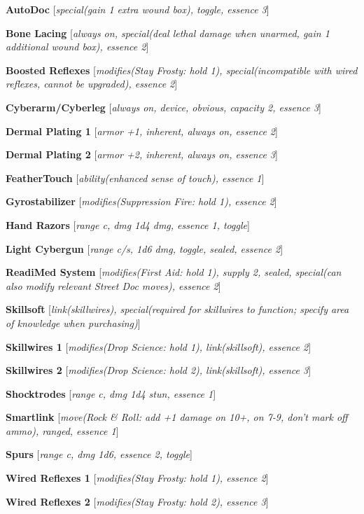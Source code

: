 \documentclass[oneside,10pt]{article}
\begin{document}
\begin{multicols}{2}
  \textbf{AutoDoc} [\textit{special(gain 1 extra wound box), toggle,
    essence 3}]

  \textbf{Bone Lacing} [\textit{always on, special(deal lethal damage
    when unarmed, gain 1 additional wound box), essence 2}]

  \textbf{Boosted Reflexes} [\textit{modifies(Stay Frosty: hold 1),
    special(incompatible with wired reflexes, cannot be upgraded),
    essence 2}]

  \textbf{Cyberarm/Cyberleg} [\textit{always on, device, obvious,
    capacity 2, essence 3}]

  \textbf{Dermal Plating 1} [\textit{armor +1, inherent, always on,
    essence 2}]

  \textbf{Dermal Plating 2} [\textit{armor +2, inherent, always on,
    essence 3}]

  \textbf{FeatherTouch} [\textit{ability(enhanced sense of touch),
    essence 1}]

  \textbf{Gyrostabilizer} [\textit{modifies(Suppression Fire: hold 1),
    essence 2}]

  \textbf{Hand Razors} [\textit{range c, dmg 1d4 dmg, essence 1,
    toggle}]

  \textbf{Light Cybergun} [\textit{range c/s, 1d6 dmg, toggle, sealed,
    essence 2}]

  \textbf{ReadiMed System} [\textit{modifies(First Aid: hold 1),
    supply 2, sealed, special(can also modify relevant Street Doc
    moves), essence 2}]

  \textbf{Skillsoft} [\textit{link(skillwires), special(required for
    skillwires to function; specify area of knowledge when
    purchasing)}]

  \textbf{Skillwires 1} [\textit{modifies(Drop Science: hold 1),
    link(skillsoft), essence 2}]

  \textbf{Skillwires 2} [\textit{modifies(Drop Science: hold 2),
    link(skillsoft), essence 3}]

  \textbf{Shocktrodes} [\textit{range c, dmg 1d4 stun, essence 1}]

  \textbf{Smartlink} [\textit{move(Rock \& Roll: add +1 damage on 10+,
    on 7-9, don’t mark off ammo), ranged, essence 1}]

  \textbf{Spurs} [\textit{range c, dmg 1d6, essence 2, toggle}]

  \textbf{Wired Reflexes 1} [\textit{modifies(Stay Frosty: hold 1),
    essence 2}]

  \textbf{Wired Reflexes 2} [\textit{modifies(Stay Frosty: hold 2),
    essence 3}]


\end{multicols}
\end{document}
